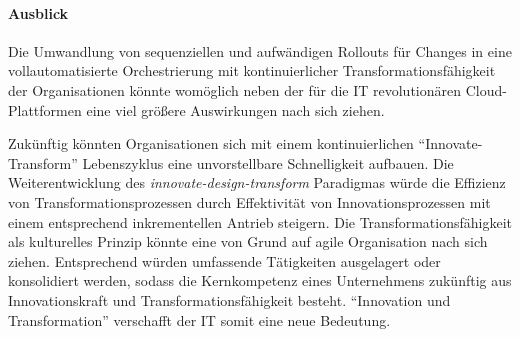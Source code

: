 \paragraph{Ausblick}


Die Umwandlung von sequenziellen und aufwändigen Rollouts für Changes in eine vollautomatisierte Orchestrierung mit kontinuierlicher Transformationsfähigkeit der Organisationen könnte womöglich neben der für die IT revolutionären Cloud-Plattformen eine viel größere Auswirkungen nach sich ziehen. 

Zukünftig könnten Organisationen sich mit einem kontinuierlichen \enquote{Innovate-Transform} Lebenszyklus eine unvorstellbare Schnelligkeit aufbauen.
Die Weiterentwicklung des \emph{innovate-design-transform} Paradigmas würde die Effizienz von Transformationsprozessen durch Effektivität von Innovationsprozessen mit einem entsprechend inkrementellen Antrieb steigern. Die Transformationsfähigkeit als kulturelles Prinzip könnte eine von Grund auf agile Organisation nach sich ziehen. Entsprechend würden umfassende Tätigkeiten ausgelagert oder konsolidiert werden, sodass die Kernkompetenz eines Unternehmens zukünftig aus Innovationskraft und Transformationsfähigkeit besteht. \enquote{Innovation und Transformation} verschafft der IT somit eine neue Bedeutung.